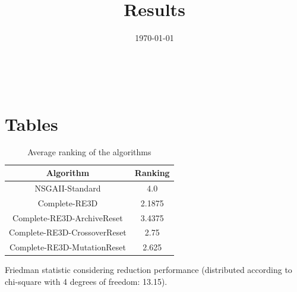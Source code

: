 \documentclass{article}
\title{Results}
\author{}
\date{\today}
\begin{document}
\oddsidemargin 0in \topmargin 0in\maketitle
\
\section{Tables}
\begin{table}[!htp]
\centering
\caption{Average ranking of the algorithms}
\begin{tabular}{c|c}
Algorithm&Ranking\\
\hline
NSGAII-Standard&4.0\\
Complete-RE3D&2.1875\\
Complete-RE3D-ArchiveReset&3.4375\\
Complete-RE3D-CrossoverReset&2.75\\
Complete-RE3D-MutationReset&2.625\\
\end{tabular}
\end{table}


Friedman statistic considering reduction performance (distributed according to chi-square with 4 degrees of freedom: 13.15).
\end{document}
